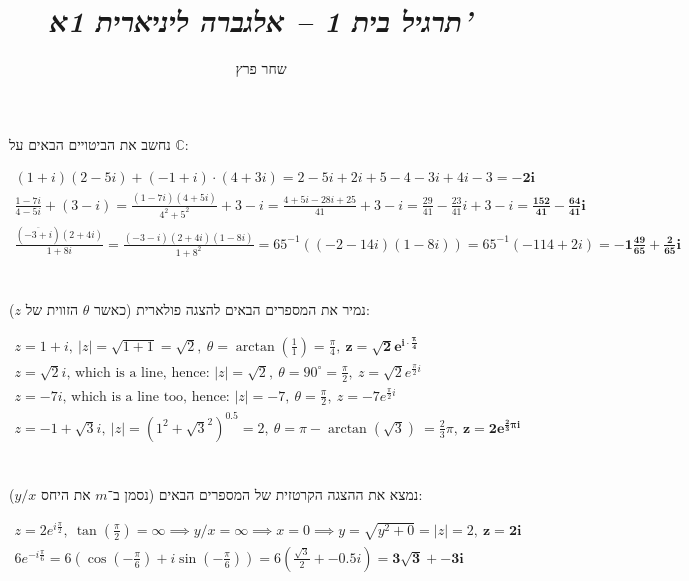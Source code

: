 \documentclass[]{article}
\author{שחר פרץ}
\title{\textit{תרגיל בית 1 -- אלגברה ליניארית  1א'}}
\newcommand\en[1] {\begin{otherlanguage}{english}#1\end{otherlanguage}}
\newcommand\sen   {\begin{otherlanguage}{english}}
\newcommand\she   {\end{otherlanguage}}
\newcommand\C     {\mathbb{C}}
\newcommand\ol    {\overline}
\newcommand\ta    {\theta}
\renewcommand\inf {\infty}
\newcommand\op    {^{-1}}
\newcommand\cl [1]    {\left ( #1 \right )}
\begin{document}
	\maketitle
	\section{}
	נחשב את הביטויים הבאים על $\C$: 
	\en{\begin{gather}
		(1 + i)(2 - 5i) + (-1 + i) \cdot (4 + 3i) = 2 - 5i + 2i + 5 -4 -3i + 4i - 3 = \bm{-2i} \\
		\frac{1 - 7i}{4 - 5i} + (3 - i) = \frac{(1 - 7i)(4 + 5i)}{4^2 + 5^2} + 3 - i = \frac{4 + 5i -28i +25}{41} + 3 - i = \frac{29}{41} - \frac{23}{41}i + 3 - i = \bm{\frac{152}{41} - \frac{64}{41}i} \\
		\frac{(\ol{-3 + i})(2 + 4i)}{1 + 8i} = \frac{(-3 - i)(2 + 4i)(1 - 8i)}{1 + 8^2} = 65\op\cl{(-2 - 14i)(1 - 8i)} = 65\op(-114 + 2i) = \bm{-1\frac{49}{65} + \frac{2}{65}i}
	\end{gather}}
	
	\section{}
	נמיר את המספרים הבאים להצגה פולארית (כאשר $\ta$ הזווית של $z$): 
	\setcounter{equation}{0}
	\en{\begin{gather}
			z = 1 + i, \ |z| = \sqrt{1 + 1} = \sqrt{2}, \ \ta = \arctan\cl{\frac{1}{1}} = \frac{\pi}{4}, \ \bm{z = \sqrt2e^{i \cdot \frac{\pi}{4}}} \\
			z = \sqrt{2}i, \, \text{which is a line, hence: }|z| = \sqrt{2}, \ \ta = 90^\circ = \frac{\pi}{2}, \ z = \sqrt{2}e^{\frac{\pi}{2}i} \\
			z =  -7i, \, \text{which is a line too, hence: }|z| = -7, \ \ta = \frac{\pi}{2}, \ z = -7e^{\frac{\pi}{2}i} \\
			z = -1 + \sqrt{3}i, \ |z| = \cl{1^2 + \sqrt{3}^2}^{0.5} = 2, \ \ta = \pi - \arctan\left(\sqrt3\right)\ = \frac{2}{3}\pi, \ \bm{z = 2e^{\frac{2}{3}\pi i}}
	\end{gather}}

	\section{}
	נמצא את ההצגה הקרטזית של המספרים הבאים (נסמן ב־$m$ את היחס $y / x$): 
	\setcounter{equation}{0}
	\sen
	\begin{gather}
		z = 2e^{i\frac{\pi}{2}}, \ \tan\cl{\frac{\pi}{2}} = \inf \implies y / x = \inf \implies x = 0 \implies y = \sqrt{y^2 + 0} = |z| = 2, \ \bm{z = 2i} \\
		6e^{-i\frac{\pi}{6}} = 6\cl{\cos\cl{-\frac{\pi}{6}} + i \sin \cl{-\frac{\pi}{6}}} = 6\cl{\frac{\sqrt3}{2} + -0.5i} = \bm{3\sqrt3 + -3i}
	\end{gather}
	\she
	
\end{document}
